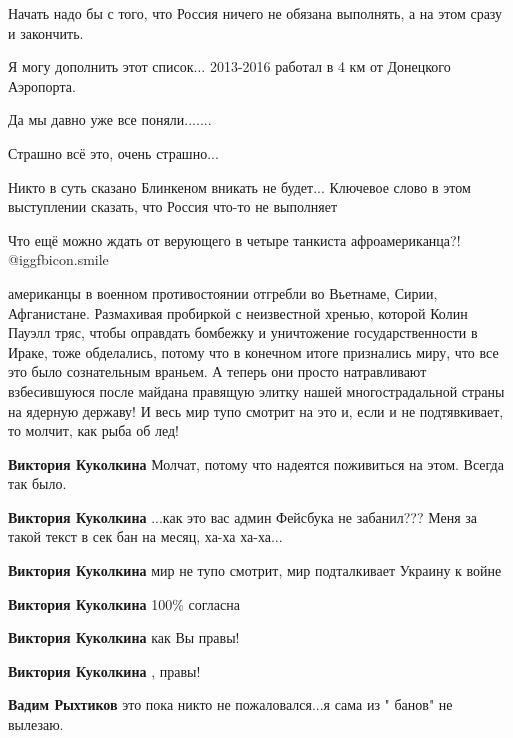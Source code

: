 \begin{itemize}
Начать надо бы с того, что Россия ничего не обязана выполнять, а на этом сразу и закончить.

Я могу дополнить этот список... 2013-2016 работал в 4 км от Донецкого Аэропорта.

Да мы давно уже все поняли.......

Страшно всё это, очень страшно...

Никто в суть сказано Блинкеном вникать не будет... Ключевое слово в этом выступлении сказать, что Россия что-то не выполняет

Что ещё можно ждать от верующего в четыре танкиста афроамериканца?!  @igg{fbicon.smile} 


американцы в военном противостоянии отгребли во Вьетнаме, Сирии, Афганистане.
Размахивая пробиркой с неизвестной хренью, которой Колин Пауэлл тряс, чтобы
оправдать бомбежку и уничтожение государственности в Ираке, тоже обделались,
потому что в конечном итоге признались миру, что все это было сознательным
враньем. А теперь они просто натравливают взбесившуюся после майдана правящую
элитку нашей многострадальной страны на ядерную державу! И весь мир тупо
смотрит на это и, если и не подтявкивает, то молчит, как рыба об лед!

\begin{itemize} %
\textbf{Виктория Куколкина} Молчат, потому что надеятся поживиться на этом. Всегда так было.

\textbf{Виктория Куколкина} ...как это вас админ Фейсбука не забанил??? Меня за такой текст в сек бан на месяц, ха-ха ха-ха...

\textbf{Виктория Куколкина} мир не тупо смотрит, мир подталкивает Украину к войне

\textbf{Виктория Куколкина} 100\% согласна

\textbf{Виктория Куколкина} как Вы правы!

\textbf{Виктория Куколкина} , правы!

\textbf{Вадим Рыхтиков} это пока никто не пожаловался...я сама из " банов" не вылезаю.
\end{itemize} %



\end{itemize}
